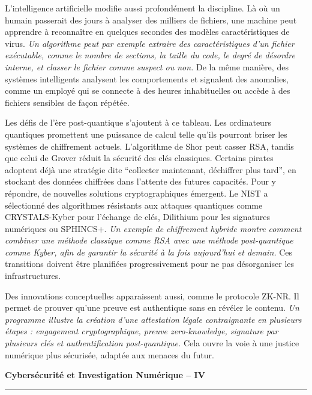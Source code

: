 \documentclass[12pt,a4paper]{article}
\newcommand{\HRule}{\rule{\linewidth}{1pt}}
\begin{document}
	\medskip
	\noindent
	L’intelligence artificielle modifie aussi profondément la discipline. Là où un humain passerait des jours à analyser des milliers de fichiers, une machine peut apprendre à reconnaître en quelques secondes des modèles caractéristiques de virus. \textit{Un algorithme peut par exemple extraire des caractéristiques d’un fichier exécutable, comme le nombre de sections, la taille du code, le degré de désordre interne, et classer le fichier comme suspect ou non.} De la même manière, des systèmes intelligents analysent les comportements et signalent des anomalies, comme un employé qui se connecte à des heures inhabituelles ou accède à des fichiers sensibles de façon répétée.
	
	\medskip
	\noindent
	Les défis de l’ère post-quantique s’ajoutent à ce tableau. Les ordinateurs quantiques promettent une puissance de calcul telle qu’ils pourront briser les systèmes de chiffrement actuels. L’algorithme de Shor peut casser RSA, tandis que celui de Grover réduit la sécurité des clés classiques. Certains pirates adoptent déjà une stratégie dite “collecter maintenant, déchiffrer plus tard”, en stockant des données chiffrées dans l’attente des futures capacités. Pour y répondre, de nouvelles solutions cryptographiques émergent. Le NIST a sélectionné des algorithmes résistants aux attaques quantiques comme CRYSTALS-Kyber pour l’échange de clés, Dilithium pour les signatures numériques ou SPHINCS+. \textit{Un exemple de chiffrement hybride montre comment combiner une méthode classique comme RSA avec une méthode post-quantique comme Kyber, afin de garantir la sécurité à la fois aujourd’hui et demain.} Ces transitions doivent être planifiées progressivement pour ne pas désorganiser les infrastructures.
	
	\medskip
	\noindent
	Des innovations conceptuelles apparaissent aussi, comme le protocole ZK-NR. Il permet de prouver qu’une preuve est authentique sans en révéler le contenu. \textit{Un programme illustre la création d’une attestation légale contraignante en plusieurs étapes : engagement cryptographique, preuve zero-knowledge, signature par plusieurs clés et authentification post-quantique.} Cela ouvre la voie à une justice numérique plus sécurisée, adaptée aux menaces du futur.
	
	\vfill
	
	\begin{flushleft}
		\textbf{Cybersécurité et Investigation Numérique -- IV}
		\HRule 
	\end{flushleft}  
	
\end{document}

